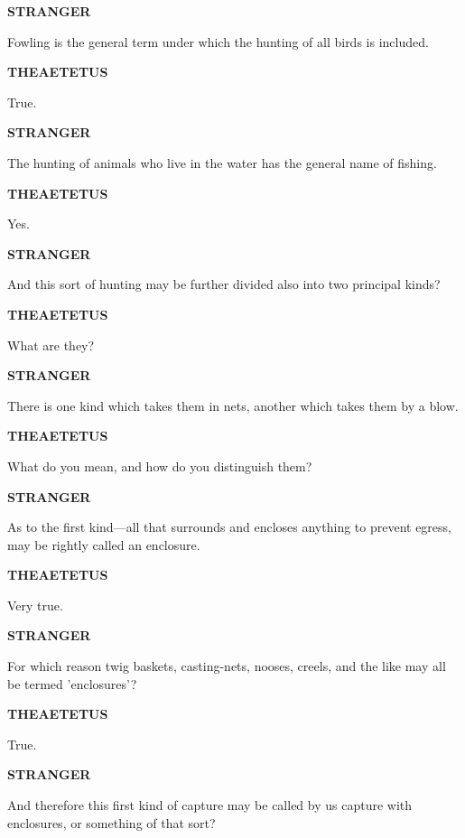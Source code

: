 \documentclass[11pt,letter]{article}
\begin{document}
\par \textbf{STRANGER}
\par   Fowling is the general term under which the hunting of all birds is included.

\par \textbf{THEAETETUS}
\par   True.

\par \textbf{STRANGER}
\par   The hunting of animals who live in the water has the general name of fishing.

\par \textbf{THEAETETUS}
\par   Yes.

\par \textbf{STRANGER}
\par   And this sort of hunting may be further divided also into two principal kinds?

\par \textbf{THEAETETUS}
\par   What are they?

\par \textbf{STRANGER}
\par   There is one kind which takes them in nets, another which takes them by a blow.

\par \textbf{THEAETETUS}
\par   What do you mean, and how do you distinguish them?

\par \textbf{STRANGER}
\par   As to the first kind—all that surrounds and encloses anything to prevent egress, may be rightly called an enclosure.

\par \textbf{THEAETETUS}
\par   Very true.

\par \textbf{STRANGER}
\par   For which reason twig baskets, casting-nets, nooses, creels, and the like may all be termed 'enclosures'?

\par \textbf{THEAETETUS}
\par   True.

\par \textbf{STRANGER}
\par   And therefore this first kind of capture may be called by us capture with enclosures, or something of that sort?
\end{document}
